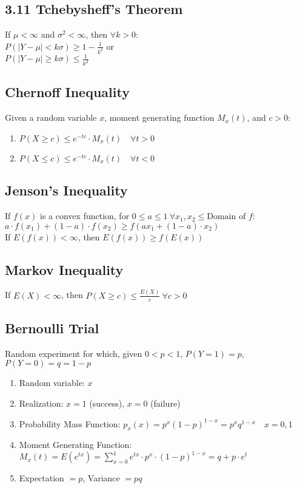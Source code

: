\documentclass[12pt]{article}
\newcommand{\abs}[1]{\left|#1\right|}
\begin{document}
\subsection{3.11 Tchebysheff's Theorem}

If $\mu < \infty$ and $\sigma^2 < \infty$, then $\forall k > 0$: \\
$P(\abs{Y - \mu} < k\sigma) \ge 1 - \frac{1}{k^2}$ or \\
$P(\abs{Y - \mu} \ge k\sigma) \le \frac{1}{k^2}$

\subsection{Chernoff Inequality}

Given a random variable $x$, moment generating function $M_x(t)$, and $c > 0$:

\begin{enumerate}
	\item $P(X \ge c) \le e^{-tc} \cdot M_x(t) \quad \forall t > 0$
	\item $P(X \le c) \le e^{-tc} \cdot M_x(t) \quad \forall t < 0$
\end{enumerate}

\subsection{Jenson's Inequality}

If $f(x)$ is a convex function, for $0 \le a \le 1 \ \forall x_1, x_2 \le \text{Domain of } f$:\\
$a \cdot f(x_1) + (1 - a) \cdot f(x_2) \ge f(ax_1 + (1 - a) \cdot x_2)$ \\

If $E(f(x)) < \infty$, then $E(f(x)) \ge f(E(x))$

\subsection{Markov Inequality}

If $E(X) < \infty$, then $P(X \ge c) \le \frac{E(X)}{c} \ \forall c > 0$

\subsection{Bernoulli Trial}

Random experiment for which, given $0 < p < 1$, $P(Y = 1) = p$, $P(Y = 0) = q = 1 - p$

\begin{enumerate}
	\item Random variable: $x$
	\item Realization: $x = 1$ (success), $x = 0$ (failure)
	\item Probability Mass Function: $p_x(x) = p^x (1-p)^{1-x} = p^x q^{1-x} \quad x = 0, 1$
	\item Moment Generating Function: $M_x(t) = E(e^{tx}) = \sum_{x=0}^1 e^{tx} \cdot p^x \cdot (1 - p)^{1-x} = q + p \cdot e^t$
	\item Expectation $= p$, Variance $=pq$
\end{enumerate}
\end{document}
